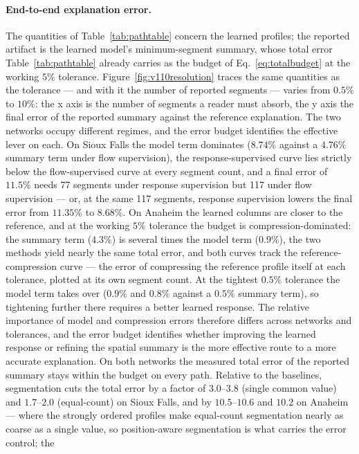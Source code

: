 \paragraph{End-to-end explanation error.}
The quantities of Table~\ref{tab:pathtable} concern the learned
profiles; the reported artifact is the learned model's minimum-segment
summary, whose total error Table~\ref{tab:pathtable} already carries as
the budget of Eq.~\eqref{eq:totalbudget} at the working $5\%$ tolerance.
Figure~\ref{fig:v110resolution} traces the same quantities as the
tolerance --- and with it the number of reported segments --- varies
from $0.5\%$ to $10\%$: the x axis is the number of segments a reader
must absorb, the y axis the final error of the reported summary against
the reference explanation. The two networks occupy different regimes,
and the error budget identifies the effective lever on each. On Sioux
Falls the model term dominates ($8.74\%$ against a $4.76\%$ summary
term under flow supervision), the response-supervised curve lies
strictly below the flow-supervised curve at every segment count, and a
final error of $11.5\%$ needs 77 segments under response supervision
but 117 under flow supervision --- or, at the same 117 segments,
response supervision lowers the final error from $11.35\%$ to
$8.68\%$. On Anaheim the learned columns are closer to the reference,
and at the working $5\%$ tolerance the budget is compression-dominated:
the summary term ($4.3\%$) is several times the model term ($0.9\%$),
the two methods yield nearly the same total error, and both curves
track the reference-compression curve --- the error of compressing the
reference profile itself at each tolerance, plotted at its own segment
count. At the tightest $0.5\%$ tolerance the model term takes over
($0.9\%$ and $0.8\%$ against a $0.5\%$ summary term), so tightening
further there requires a better learned response. The relative
importance of model and compression errors therefore differs across
networks and tolerances, and the error budget identifies whether
improving the learned response or refining the spatial summary is the
more effective route to a more accurate explanation. On both networks
the measured total error of the reported summary stays within the
budget on every path. Relative to the baselines, segmentation cuts the
total error by a factor of $3.0$--$3.8$ (single common value) and
$1.7$--$2.0$ (equal-count) on Sioux Falls, and by $10.5$--$10.6$ and
$10.2$ on Anaheim --- where the strongly ordered profiles make
equal-count segmentation nearly as coarse as a single value, so
position-aware segmentation is what carries the error control; the
